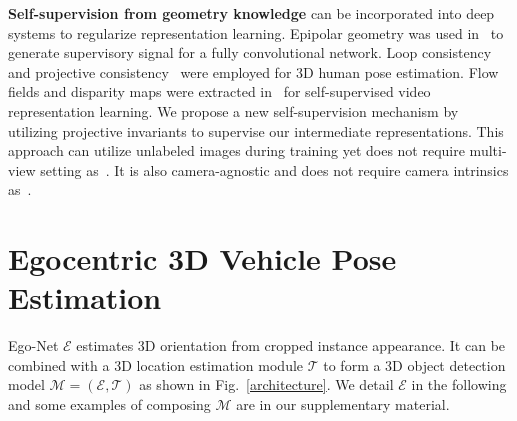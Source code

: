 \documentclass[final]{cvpr}
\begin{document}
\noindent \textbf{Self-supervision from geometry knowledge} can be incorporated into deep systems to regularize representation learning. Epipolar geometry was used in~\cite{kocabas2019self} to generate supervisory signal for a fully convolutional network. Loop consistency~\cite{chen2019unsupervised} and projective consistency~\cite{habibie2019wild} were employed for 3D human pose estimation. Flow fields and disparity maps were extracted in~\cite{gan2018geometry} for self-supervised video representation learning. We propose a new self-supervision mechanism by utilizing projective invariants to supervise our intermediate representations. This approach can utilize unlabeled images during training yet does not require multi-view setting as~\cite{kocabas2019self}. It is also camera-agnostic and does not require camera intrinsics as~\cite{habibie2019wild}.



\section{Egocentric 3D Vehicle Pose Estimation}
\label{MA}
Ego-Net $\mathcal{E}$ estimates 3D orientation from cropped instance appearance. It can be combined with a 3D location estimation module $\mathcal{T}$ to form a 3D object detection model $\mathcal{M} = (\mathcal{E}, \mathcal{T})$ as shown in Fig.~\ref{architecture}. We detail $\mathcal{E}$ in the following and some examples of composing $\mathcal{M}$ are in our supplementary material. 
\end{document}
